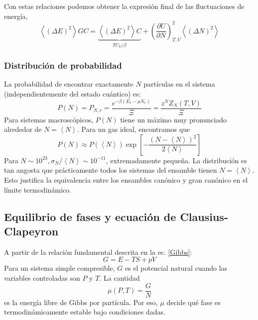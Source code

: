 \documentclass[]{article}
\numberwithin{equation}{section}
\newcommand{\deriv}[3]{\left(\frac{\partial #1}{\partial #2} \right)_{#3}}
\newcommand{\0}{\textcolor{gray}{0}}
\newcommand{\pr}[1]{\left\langle #1 \right\rangle }
\begin{document}
Con estas relaciones podemos obtener la expresión final de las fluctuaciones de energía,
\begin{equation}
	\pr{ (\Delta E)^2}{GC} = \underbrace{\pr{ (\Delta E)^2}{C}}_{T C_V/\beta} + \deriv{U}{N}{T,V}^2 \pr{ (\Delta N)^2}
\end{equation}

\subsubsection{Distribución de probabilidad}
La probabilidad de encontrar exactamente \(N\) partículas en el sistema (independientemente del estado cuántico) es:
\begin{equation*}
	P(N) = P_{N,r} = \frac{e^{- \beta\left(E_{r} - \mu N_r\right)}}{\Xi} = \frac{z^N Z_N (T,V)}{\Xi}
\end{equation*}
Para sistemas macroscópicos, \(P (N )\) tiene un máximo muy pronunciado alrededor de \(N = \pr{N} \). Para un gas ideal, encontramos que
\begin{equation}
	P(N) \approx P(\pr{N}) \exp\left[- \frac{\left(N - \pr{N}\right)^2}{2 \pr{N}}\right]
\end{equation}
Para \( N \sim 10^{23}, \sigma_N/\pr{N} \sim 10^{−11}\), extremadamente pequeña. La distribución es tan angosta que prácticamente todos los sistemas del ensamble tienen \(N = \pr{N}\). Esto justifica la equivalencia entre los ensambles canónico y gran canónico en el límite termodinámico.

\subsection{Equilibrio de fases y ecuación de Clausius-Clapeyron}
A partir de la relación fundamental descrita en la ec. \ref{Gibbs}:
\begin{equation*}
	G = E - TS + pV
\end{equation*}
Para un sistema simple compresible, \(G\) es el potencial natural cuando las variables controladas son \(P\) y \(T \). La cantidad
\begin{equation*}
	\mu(P,T) = \frac{G}{N}
\end{equation*}
es la energía libre de Gibbs por partícula. Por eso, \(\mu\) decide qué fase es termodinámicamente estable bajo condiciones dadas.
\end{document}
